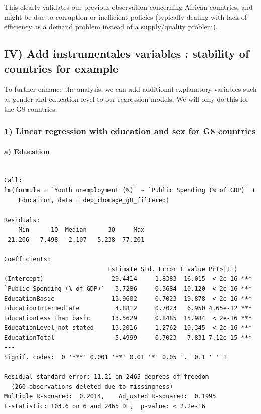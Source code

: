 \documentclass[
  letterpaper,
  DIV=11,
  numbers=noendperiod]{scrartcl}
\let\oldparagraph\paragraph
\renewcommand{\paragraph}[1]{\oldparagraph{#1}\mbox{}}
\begin{document}
This clearly validates our previous observation concerning African
countries, and might be due to corruption or inefficient policies
(typically dealing with lack of efficiency as a demand problem instead
of a supply/quality problem).

\hypertarget{iv-add-instrumentales-variables-stability-of-countries-for-example}{%
\subsection{IV) Add instrumentales variables : stability of countries
for
example}\label{iv-add-instrumentales-variables-stability-of-countries-for-example}}

To further enhance the analysis, we can add additional explanatory
variables such as gender and education level to our regression models.
We will only do this for the G8 countries.

\hypertarget{linear-regression-with-education-and-sex-for-g8-countries}{%
\subsubsection{1) Linear regression with education and sex for G8
countries}\label{linear-regression-with-education-and-sex-for-g8-countries}}

\hypertarget{a-education}{%
\paragraph{a) Education}\label{a-education}}

\begin{verbatim}

Call:
lm(formula = `Youth unemployment (%)` ~ `Public Spending (% of GDP)` + 
    Education, data = dep_chomage_g8_filtered)

Residuals:
    Min      1Q  Median      3Q     Max 
-21.206  -7.498  -2.107   5.238  77.201 

Coefficients:
                             Estimate Std. Error t value Pr(>|t|)    
(Intercept)                   29.4414     1.8383  16.015  < 2e-16 ***
`Public Spending (% of GDP)`  -3.7286     0.3684 -10.120  < 2e-16 ***
EducationBasic                13.9602     0.7023  19.878  < 2e-16 ***
EducationIntermediate          4.8812     0.7023   6.950 4.65e-12 ***
EducationLess than basic      13.5629     0.8485  15.984  < 2e-16 ***
EducationLevel not stated     13.2016     1.2762  10.345  < 2e-16 ***
EducationTotal                 5.4999     0.7023   7.831 7.12e-15 ***
---
Signif. codes:  0 '***' 0.001 '**' 0.01 '*' 0.05 '.' 0.1 ' ' 1

Residual standard error: 11.21 on 2465 degrees of freedom
  (260 observations deleted due to missingness)
Multiple R-squared:  0.2014,    Adjusted R-squared:  0.1995 
F-statistic: 103.6 on 6 and 2465 DF,  p-value: < 2.2e-16
\end{verbatim}
\end{document}
